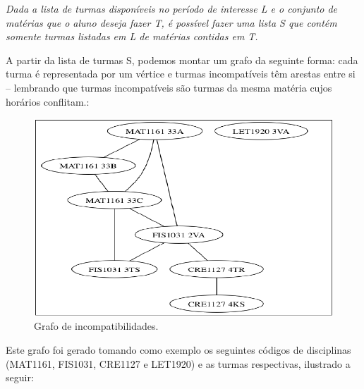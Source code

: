 \documentclass[graduacao,brazil]{ThesisPUC}
\begin{document}
\vspace{3 mm}
\textit{Dada a lista de turmas disponíveis no período de interesse L e o conjunto de matérias que o aluno deseja fazer T, é possível fazer uma lista S que contém somente turmas listadas em L de matérias contidas em T.}
\vspace{3 mm}

A partir da lista de turmas S, podemos montar um grafo da seguinte forma: cada turma é representada por um vértice e turmas incompatíveis têm arestas entre si – lembrando que turmas incompatíveis são turmas da mesma matéria cujos horários conflitam.:

\begin{figure}[H]
    \centering
    \includegraphics[width=\linewidth]{img/independentset.png}
    \caption{Grafo de incompatibilidades.}
\end{figure}

Este grafo foi gerado tomando como exemplo os seguintes códigos de disciplinas (MAT1161, FIS1031, CRE1127 e LET1920) e as turmas respectivas, ilustrado a seguir:
\end{document}
